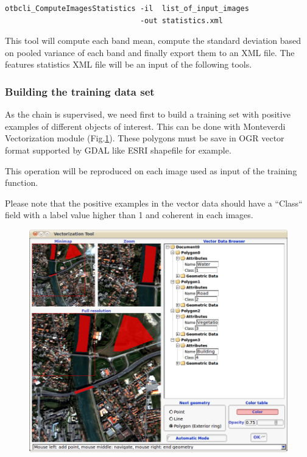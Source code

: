 \begin{verbatim}
otbcli_ComputeImagesStatistics -il  list_of_input_images
                               -out statistics.xml
\end{verbatim}

This tool will compute each band mean, compute the standard deviation based on
pooled variance of each band and finally export them to an XML file.
The features statistics XML file will be an input of the following tools.

\subsubsection{Building the training data set}

As the chain is supervised, we need first to build a training set with
positive examples of different objects of interest. This can be done
with Monteverdi Vectorization module
(Fig.\ref{fig:vectoModuleDataSetCreation}).
These polygons must be save in OGR vector format supported
by GDAL like ESRI shapefile for example.

This operation will be reproduced on each image used as input of the training
function.

Please note that the positive examples in the vector data should have a ``Class``
field with a label value higher than 1 and coherent in each images.

\begin{figure}
  \center
  \includegraphics[width=1\textwidth]{../Art/MonteverdiImages/monteverdi_vectorization_module_for_classification.png}
  \label{fig:vectoModuleDataSetCreation}
\end{figure}

